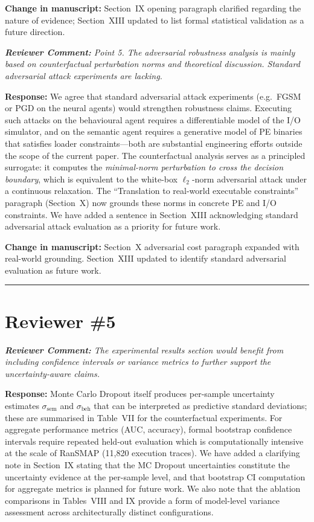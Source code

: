 \documentclass[11pt,a4paper]{article}
\newcommand{\RC}[1]{\begin{reviewbox}\textit{\textbf{Reviewer Comment:} #1}\end{reviewbox}}
\newcommand{\RS}[1]{\noindent\textcolor{responsegreen}{\textbf{Response:}} #1\par\medskip}
\newcommand{\CH}[1]{\noindent\textcolor{changebrown}{\textbf{Change in manuscript:}} #1\par\bigskip}
\begin{document}
\CH{Section~IX opening paragraph clarified regarding the nature of evidence;
Section~XIII updated to list formal statistical validation as a future direction.}

\RC{Point 5. The adversarial robustness analysis is mainly based on counterfactual
perturbation norms and theoretical discussion. Standard adversarial attack
experiments are lacking.}

\RS{We agree that standard adversarial attack experiments (e.g.\ FGSM or PGD on
the neural agents) would strengthen robustness claims. Executing such attacks on
the behavioural agent requires a differentiable model of the I/O simulator, and
on the semantic agent requires a generative model of PE binaries that satisfies
loader constraints---both are substantial engineering efforts outside the scope of
the current paper. The counterfactual analysis serves as a principled surrogate:
it computes the \emph{minimal-norm perturbation to cross the decision boundary},
which is equivalent to the white-box $\ell_2$-norm adversarial attack under a
continuous relaxation. The ``Translation to real-world executable constraints''
paragraph (Section~X) now grounds these norms in concrete PE and I/O constraints.
We have added a sentence in Section~XIII acknowledging standard adversarial attack
evaluation as a priority for future work.}

\CH{Section~X adversarial cost paragraph expanded with real-world grounding.
Section~XIII updated to identify standard adversarial evaluation as future work.}

\bigskip
\hrule
\bigskip

\section{Reviewer \#5}

\RC{The experimental results section would benefit from including confidence
intervals or variance metrics to further support the uncertainty-aware claims.}

\RS{Monte Carlo Dropout itself produces per-sample uncertainty estimates
$\sigma_{\text{sem}}$ and $\sigma_{\text{beh}}$ that can be interpreted as
predictive standard deviations; these are summarised in Table~VII for the
counterfactual experiments. For aggregate performance metrics (AUC, accuracy),
formal bootstrap confidence intervals require repeated held-out evaluation which
is computationally intensive at the scale of RanSMAP (11,820 execution traces).
We have added a clarifying note in Section~IX stating that the MC Dropout
uncertainties constitute the uncertainty evidence at the per-sample level, and
that bootstrap CI computation for aggregate metrics is planned for future work.
We also note that the ablation comparisons in Tables~VIII and IX provide a form
of model-level variance assessment across architecturally distinct configurations.}
\end{document}
